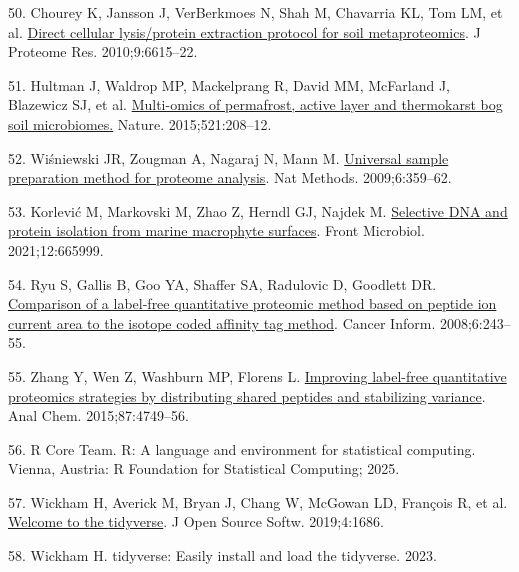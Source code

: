 \documentclass[
  12 pt,
]{article}
\newlength{\cslhangindent}
\newlength{\cslentryspacingunit} %
\newenvironment{CSLReferences}[2] %
 {%
  \setlength{\parindent}{0pt}
  \ifodd #1
  \let\oldpar\par
  \def\par{\hangindent=\cslhangindent\oldpar}
  \fi
  \setlength{\parskip}{#2\cslentryspacingunit}
 }%
 {}
\begin{document}
\begin{CSLReferences}{0}{0}
\leavevmode{}%
50. Chourey K, Jansson J, VerBerkmoes N, Shah M, Chavarria KL, Tom LM, et al. \href{https://doi.org/10.1021/pr100787q}{Direct cellular lysis/protein extraction protocol for soil metaproteomics}. J Proteome Res. 2010;9:6615--22.

\leavevmode{}%
51. Hultman J, Waldrop MP, Mackelprang R, David MM, McFarland J, Blazewicz SJ, et al. \href{https://doi.org/10.1038/nature14238}{Multi-omics of permafrost, active layer and thermokarst bog soil microbiomes.} Nature. 2015;521:208--12.

\leavevmode{}%
52. Wiśniewski JR, Zougman A, Nagaraj N, Mann M. \href{https://doi.org/10.1038/nmeth.1322}{Universal sample preparation method for proteome analysis}. Nat Methods. 2009;6:359--62.

\leavevmode{}%
53. Korlević M, Markovski M, Zhao Z, Herndl GJ, Najdek M. \href{https://doi.org/10.3389/fmicb.2021.665999}{Selective {DNA} and protein isolation from marine macrophyte surfaces}. Front Microbiol. 2021;12:665999.

\leavevmode{}%
54. Ryu S, Gallis B, Goo YA, Shaffer SA, Radulovic D, Goodlett DR. \href{https://doi.org/10.4137/CIN.S385}{Comparison of a label-free quantitative proteomic method based on peptide ion current area to the isotope coded affinity tag method}. Cancer Inform. 2008;6:243--55.

\leavevmode{}%
55. Zhang Y, Wen Z, Washburn MP, Florens L. \href{https://doi.org/10.1021/ac504740p}{Improving label-free quantitative proteomics strategies by distributing shared peptides and stabilizing variance}. Anal Chem. 2015;87:4749--56.

\leavevmode{}%
56. R Core Team. R: A language and environment for statistical computing. Vienna, Austria: R Foundation for Statistical Computing; 2025.

\leavevmode{}%
57. Wickham H, Averick M, Bryan J, Chang W, McGowan LD, François R, et al. \href{https://doi.org/10.21105/joss.01686}{Welcome to the {tidyverse}}. J Open Source Softw. 2019;4:1686.

\leavevmode{}%
58. Wickham H. {tidyverse}: Easily install and load the tidyverse. 2023.


\end{CSLReferences}
\end{document}
